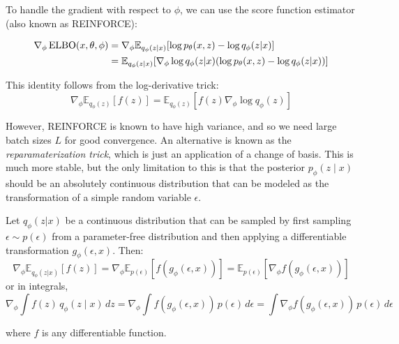   \begin{lemma}[REINFORCE]
    To handle the gradient with respect to $\phi$, we can use the score function estimator (also known as REINFORCE):

    \begin{align}
      \nabla_\phi \elbo(x, \theta, \phi) &= \nabla_\phi \mathbb{E}_{q_\phi(z|x)}[\log p_\theta(x,z) - \log q_\phi(z|x)] \\
      &= \mathbb{E}_{q_\phi(z|x)}[\nabla_\phi \log q_\phi(z|x)(\log p_\theta(x,z) - \log q_\phi(z|x))]
    \end{align}

    This identity follows from the log-derivative trick:
    \begin{equation}
      \nabla_\phi \mathbb{E}_{q_\phi(z)}[f(z)] = \mathbb{E}_{q_\phi(z)}[f(z)\nabla_\phi \log q_\phi(z)]
    \end{equation}
  \end{lemma}

  However, REINFORCE is known to have high variance, and so we need large batch sizes $L$ for good convergence. An alternative is known as the \textit{reparamaterization trick}, which is just an application of a change of basis. This is much more stable, but the only limitation to this is that the posterior $p_\phi (z \mid x)$ should be an absolutely continuous distribution that can be modeled as the transformation of a simple random variable $\epsilon$. 

  \begin{theorem}
    Let $q_\phi(z|x)$ be a continuous distribution that can be sampled by first sampling $\epsilon \sim p(\epsilon)$ from a parameter-free distribution and then applying a differentiable transformation $g_\phi(\epsilon, x)$. Then:
    \begin{equation}
       \nabla_\phi \mathbb{E}_{q_\phi(z|x)} [f(z)] = \nabla_\phi \mathbb{E}_{p(\epsilon)} [f(g_\phi(\epsilon, x))] = \mathbb{E}_{p(\epsilon)} [\nabla_\phi f(g_\phi(\epsilon, x))] 
     \end{equation}
    or in integrals, 
    \begin{equation}
     \nabla_\phi \int f(z) \, q_\phi (z \mid x) \,dz = \nabla_\phi \int f(g_\phi (\epsilon, x)) \, p(\epsilon) \,d\epsilon = \int \nabla_\phi f(g_\phi (\epsilon, x)) \, p(\epsilon) \, d\epsilon 
    \end{equation}

    where $f$ is any differentiable function. 
  \end{theorem}

